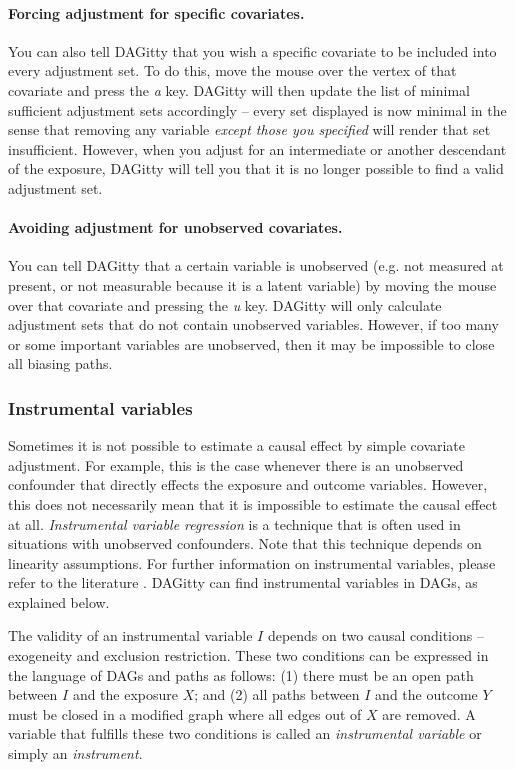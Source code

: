 \documentclass[a4paper,10pt]{article}
\newcommand{\pname}{{\sc DAG}itty\xspace}
\begin{document}
\paragraph{Forcing adjustment for specific covariates.}

You can also tell \pname that you wish a specific covariate
to be included into every adjustment set. To do this, move the
mouse over the vertex of that covariate and press the \emph{a} 
key. \pname will then update the list of minimal sufficient
adjustment sets accordingly -- every set displayed
is now minimal in the sense that removing any variable 
\emph{except those you specified} will render
that set insufficient. However, when you adjust for an intermediate
or another descendant of the exposure, \pname will tell you that it is no longer
possible to find a valid adjustment set.

\paragraph{Avoiding adjustment for unobserved covariates.}

You can tell \pname that a certain variable is unobserved 
(e.g. not measured at present, or not measurable because it is a 
latent variable) by moving the mouse 
over that covariate and pressing the \emph{u} key.
\pname will only calculate adjustment sets that do 
not contain unobserved variables. However, if too many or
some important variables are unobserved, then it may
be impossible to close all biasing paths. 

\subsubsection{Instrumental variables}

Sometimes it is not possible to estimate a causal effect by simple covariate adjustment.
For example, this is the case whenever there is an unobserved confounder that directly
effects the exposure and outcome variables. However, this does not necessarily 
mean that it is impossible to estimate the causal effect at all. 
\emph{Instrumental variable regression} is a technique that is 
often used in situations with unobserved confounders.
Note that this technique depends on linearity assumptions. For further information
on instrumental variables, please refer to the literature \cite{AngristIR96,imbens14}. 
\pname can find instrumental variables in DAGs, as explained below. 

The validity of an instrumental variable $I$ depends on two causal conditions -- 
exogeneity and exclusion restriction. These two conditions can be expressed 
in the language of DAGs and paths as follows: (1) there must be an open path between 
$I$ and the exposure $X$; and (2) all paths between $I$ and the outcome $Y$ must be
closed in a modified graph where all edges out of $X$ are removed. 
A variable that fulfills these two conditions is called an \emph{instrumental variable}
or simply an \emph{instrument}.
\end{document}
